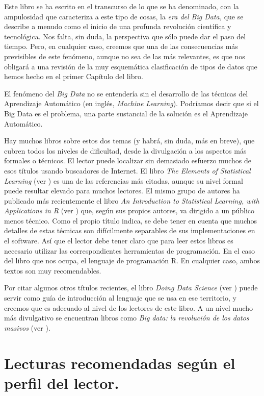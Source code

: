 Este libro se ha escrito en el transcurso de lo que se ha denominado, con la ampulosidad que caracteriza a este tipo de cosas, la  {\em era del Big Data,} que se describe a menudo como el inicio de una profunda revolución científica y tecnológica. Nos falta, sin duda, la perspectiva que sólo puede dar el paso del tiempo.  Pero, en cualquier caso, creemos que una de las consecuencias más previsibles de este fenómeno, aunque no  sea de las más relevantes, es que nos obligará a una revisión de la muy esquemática clasificación de tipos de datos que hemos hecho en el primer Capítulo del libro.

El fenómeno del {\em Big Data} no se entendería sin el desarrollo de las técnicas del Aprendizaje Automático (en inglés, {\em Machine Learning}). Podríamos decir que si el Big Data es el problema, una parte sustancial de la solución es el Aprendizaje Automático.

Hay  muchos libros sobre estos dos temas (y habrá, sin duda, más en breve), que cubren todos los niveles de dificultad, desde la divulgación a los aspectos más formales o técnicos. El lector puede localizar sin demasiado esfuerzo muchos de esos títulos usando buscadores de Internet. El libro {\em The Elements of Statistical Learning} (ver \cite{trevor2009elements}) es una de las referencias más citadas, aunque su nivel formal puede resultar elevado para muchos lectores. El mismo grupo de autores ha publicado más recientemente el libro {\em An Introduction to Statistical Learning, with Applications in R} (ver \cite{james2013introduction}) que, según sus propios autores, va dirigido a un público menos técnico. Como el propio título indica, se debe tener en cuenta que muchos detalles de estas técnicas son difícilmente separables de sus implementaciones en el software. Así que el lector debe tener claro que para leer estos libros es necesario utilizar las correspondientes herramientas de programación. En el caso del libro que nos ocupa, el lenguaje de programación R. En cualquier caso, ambos textos son muy recomendables.

Por citar algunos otros títulos recientes, el libro {\em Doing Data Science} (ver \cite{schutt2013doing}) puede servir como guía de introducción al lenguaje que se usa en ese territorio, y creemos que es adecuado al nivel de los lectores de este libro. A un nivel mucho más divulgativo se encuentran libros como {\em Big data: la revoluci{\'o}n de los datos masivos} (ver \cite{schonberger2013big}).


\section{Lecturas recomendadas según el  perfil del lector.}

